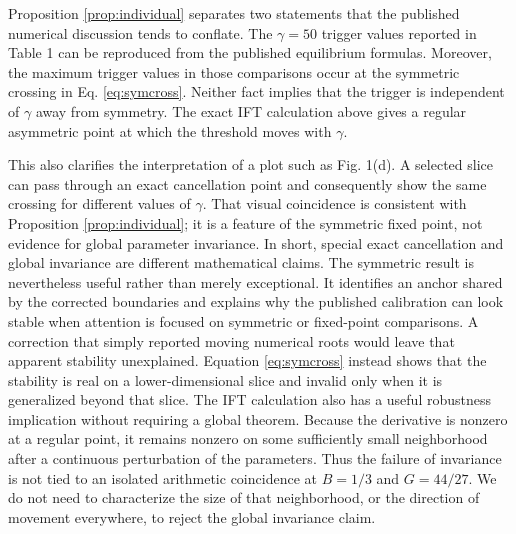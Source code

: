 Proposition \ref{prop:individual} separates two statements that the published numerical discussion tends to conflate. The $\gamma=50$ trigger values reported in Table 1 can be reproduced from the published equilibrium formulas. Moreover, the maximum trigger values in those comparisons occur at the symmetric crossing in Eq. \eqref{eq:symcross}. Neither fact implies that the trigger is independent of $\gamma$ away from symmetry. The exact IFT calculation above gives a regular asymmetric point at which the threshold moves with $\gamma$.

This also clarifies the interpretation of a plot such as Fig. 1(d). A selected slice can pass through an exact cancellation point and consequently show the same crossing for different values of $\gamma$. That visual coincidence is consistent with Proposition \ref{prop:individual}; it is a feature of the symmetric fixed point, not evidence for global parameter invariance. In short, special exact cancellation and global invariance are different mathematical claims. The symmetric result is nevertheless useful rather than merely exceptional. It identifies an anchor shared by the corrected boundaries and explains why the published calibration can look stable when attention is focused on symmetric or fixed-point comparisons. A correction that simply reported moving numerical roots would leave that apparent stability unexplained. Equation \eqref{eq:symcross} instead shows that the stability is real on a lower-dimensional slice and invalid only when it is generalized beyond that slice. The IFT calculation also has a useful robustness implication without requiring a global theorem. Because the derivative is nonzero at a regular point, it remains nonzero on some sufficiently small neighborhood after a continuous perturbation of the parameters. Thus the failure of invariance is not tied to an isolated arithmetic coincidence at $B=1/3$ and $G=44/27$. We do not need to characterize the size of that neighborhood, or the direction of movement everywhere, to reject the global invariance claim.
